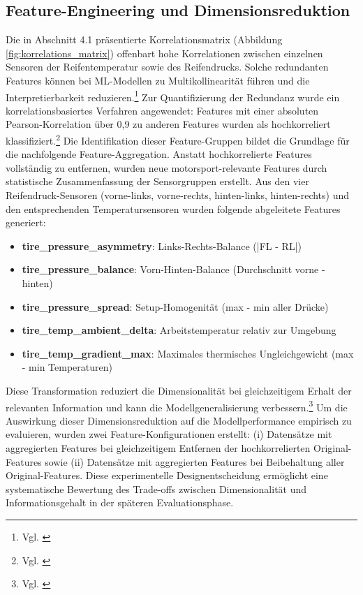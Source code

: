\subsection{Feature-Engineering und Dimensionsreduktion}

Die in Abschnitt 4.1 präsentierte Korrelationsmatrix (Abbildung \ref{fig:korrelations_matrix}) offenbart hohe Korrelationen zwischen einzelnen Sensoren der Reifentemperatur sowie des Reifendrucks. Solche redundanten Features können bei \ac{ML}-Modellen zu Multikollinearität führen und die Interpretierbarkeit reduzieren.\footnote{Vgl. \cite{Tsanas2022}} 
Zur Quantifizierung der Redundanz wurde ein korrelationsbasiertes Verfahren angewendet: Features mit einer absoluten Pearson-Korrelation über 0,9 zu anderen Features wurden als hochkorreliert klassifiziert.\footnote{Vgl. \cite{Farek2024}} Die Identifikation dieser Feature-Gruppen bildet die Grundlage für die nachfolgende Feature-Aggregation.
Anstatt hochkorrelierte Features vollständig zu entfernen, wurden neue motorsport-relevante Features durch statistische Zusammenfassung der Sensorgruppen erstellt. Aus den vier Reifendruck-Sensoren (vorne-links, vorne-rechts, hinten-links, hinten-rechts) und den entsprechenden Temperatursensoren wurden folgende abgeleitete Features generiert:

\begin{itemize}
  \item \textbf{tire\_pressure\_asymmetry}: Links-Rechts-Balance (|FL - RL|)
  \item \textbf{tire\_pressure\_balance}: Vorn-Hinten-Balance (Durchschnitt vorne - hinten)
  \item \textbf{tire\_pressure\_spread}: Setup-Homogenität (max - min aller Drücke)
  \item \textbf{tire\_temp\_ambient\_delta}: Arbeitstemperatur relativ zur Umgebung
  \item \textbf{tire\_temp\_gradient\_max}: Maximales thermisches Ungleichgewicht (max - min Temperaturen)
\end{itemize} Diese Transformation reduziert die Dimensionalität bei gleichzeitigem Erhalt der relevanten Information und kann die Modellgeneralisierung verbessern.\footnote{Vgl. \cite{Tsanas2022}}
Um die Auswirkung dieser Dimensionsreduktion auf die Modellperformance empirisch zu evaluieren, wurden zwei Feature-Konfigurationen erstellt: (i) Datensätze mit aggregierten Features bei gleichzeitigem Entfernen der hochkorrelierten Original-Features sowie (ii) Datensätze mit aggregierten Features bei Beibehaltung aller Original-Features. Diese experimentelle Designentscheidung ermöglicht eine systematische Bewertung des Trade-offs zwischen Dimensionalität und Informationsgehalt in der späteren Evaluationsphase.

